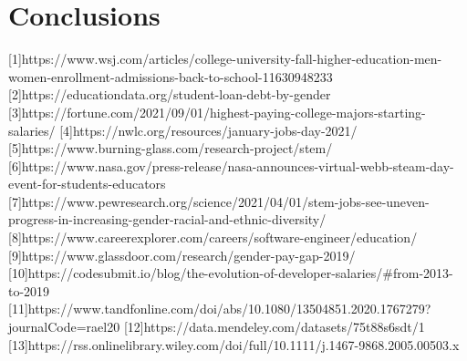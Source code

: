 \documentclass[review]{elsarticle}
\begin{document}
\section{Conclusions}





[1]https://www.wsj.com/articles/college-university-fall-higher-education-men-women-enrollment-admissions-back-to-school-11630948233
[2]https://educationdata.org/student-loan-debt-by-gender
[3]https://fortune.com/2021/09/01/highest-paying-college-majors-starting-salaries/
[4]https://nwlc.org/resources/january-jobs-day-2021/
[5]https://www.burning-glass.com/research-project/stem/
[6]https://www.nasa.gov/press-release/nasa-announces-virtual-webb-steam-day-event-for-students-educators
[7]https://www.pewresearch.org/science/2021/04/01/stem-jobs-see-uneven-progress-in-increasing-gender-racial-and-ethnic-diversity/
[8]https://www.careerexplorer.com/careers/software-engineer/education/
[9]https://www.glassdoor.com/research/gender-pay-gap-2019/
[10]https://codesubmit.io/blog/the-evolution-of-developer-salaries/#from-2013-to-2019
[11]https://www.tandfonline.com/doi/abs/10.1080/13504851.2020.1767279?journalCode=rael20
[12]https://data.mendeley.com/datasets/75t88s6sdt/1
[13]https://rss.onlinelibrary.wiley.com/doi/full/10.1111/j.1467-9868.2005.00503.x
\end{document}
